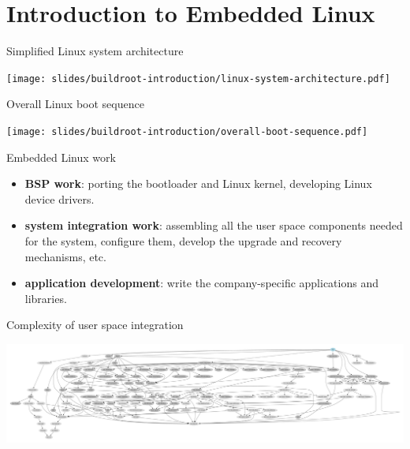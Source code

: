 \section{Introduction to Embedded Linux}

\begin{frame}{Simplified Linux system architecture}
  \begin{center}
    \texttt{[image: slides/buildroot-introduction/linux-system-architecture.pdf]}
  \end{center}
\end{frame}

\begin{frame}{Overall Linux boot sequence}
  \begin{center}
    \texttt{[image: slides/buildroot-introduction/overall-boot-sequence.pdf]}
  \end{center}
\end{frame}

\begin{frame}{Embedded Linux work}
  \begin{itemize}
  \item {\bf BSP work}: porting the bootloader and Linux kernel,
    developing Linux device drivers.
  \item {\bf system integration work}: assembling all the user space
    components needed for the system, configure them, develop the
    upgrade and recovery mechanisms, etc.
  \item {\bf application development}: write the company-specific
    applications and libraries.
  \end{itemize}
\end{frame}

\begin{frame}{Complexity of user space integration}
  \begin{center}
    \includegraphics[width=\textwidth]{slides/buildroot-introduction/graph-depends.pdf}
  \end{center}
\end{frame}

